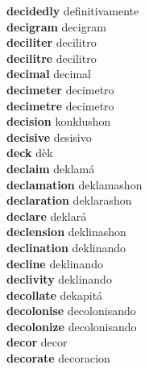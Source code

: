\textbf{decidedly } definitivamente \\
\textbf{decigram } decigram \\
\textbf{deciliter } decilitro \\
\textbf{decilitre } decilitro \\
\textbf{decimal } decimal \\
\textbf{decimeter } decimetro \\
\textbf{decimetre } decimetro \\
\textbf{decision } konklushon \\
\textbf{decisive } desisivo \\
\textbf{deck } dèk \\
\textbf{declaim } deklamá \\
\textbf{declamation } deklamashon \\
\textbf{declaration } deklarashon \\
\textbf{declare } deklará \\
\textbf{declension } deklinashon \\
\textbf{declination } deklinando \\
\textbf{decline } deklinando \\
\textbf{declivity } deklinando \\
\textbf{decollate } dekapitá \\
\textbf{decolonise } decolonisando \\
\textbf{decolonize } decolonisando \\
\textbf{decor } decor \\
\textbf{decorate } decoracion \\
